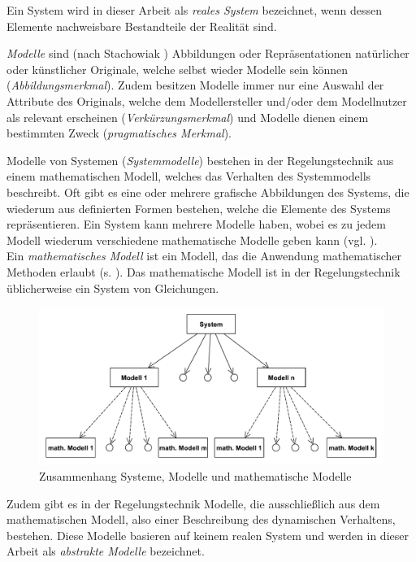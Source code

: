 Ein System wird in dieser Arbeit als \textit{reales System} bezeichnet, wenn dessen Elemente nachweisbare Bestandteile der Realität sind.

\textit{Modelle} sind (nach Stachowiak \cite[S. 13ff]{STA73}) Abbildungen oder Repräsentationen natürlicher oder künstlicher Originale, welche selbst wieder Modelle sein können (\textit{Abbildungsmerkmal}). Zudem besitzen Modelle immer nur eine Auswahl der Attribute des Originals, welche dem Modellersteller und/oder dem Modellnutzer als relevant erscheinen (\textit{Verkürzungsmerkmal}) und Modelle dienen einem bestimmten Zweck (\textit{pragmatisches Merkmal}). 

Modelle von Systemen (\textit{Systemmodelle}) bestehen in der Regelungstechnik aus einem mathematischen Modell, welches das Verhalten des Systemmodells beschreibt. Oft gibt es eine oder mehrere grafische Abbildungen des Systems, die wiederum aus definierten Formen bestehen, welche die Elemente des Systems repräsentieren. Ein System kann mehrere Modelle haben, wobei es zu jedem Modell wiederum verschiedene mathematische Modelle geben kann (vgl. \cite[Abschnitt 2.1]{LUD95}).\\
Ein \textit{mathematisches Modell} ist ein Modell, das die Anwendung mathematischer Methoden erlaubt (s. \cite[S.9]{GRVO16}). Das mathematische Modell ist in der Regelungstechnik üblicherweise ein System von Gleichungen. 

\begin{figure}[H]
	\centering
	\includegraphics[width=0.9\linewidth]{Systeme_Modelle_Math_Beschreibung}
	\caption[Zusammenhang Systeme, Modelle und mathematische Modelle]{Zusammenhang Systeme, Modelle und mathematische Modelle\protect\footnotemark}
	\label{fig:SysModelleSkizze}
\end{figure}

Zudem gibt es in der Regelungstechnik Modelle, die ausschließlich aus dem mathematischen Modell, also einer Beschreibung des dynamischen Verhaltens, bestehen. Diese Modelle basieren auf keinem realen System und werden in dieser Arbeit als \textit{abstrakte Modelle} bezeichnet. %

